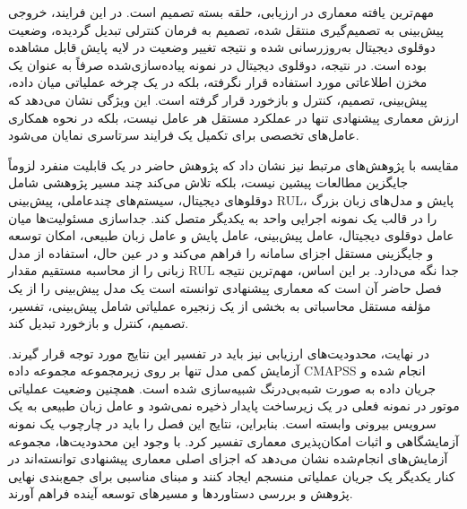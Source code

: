 مهم‌ترین یافته معماری در ارزیابی، حلقه بسته تصمیم است. در این فرایند، خروجی پیش‌بینی به تصمیم‌گیری منتقل شده، تصمیم به فرمان کنترلی تبدیل گردیده، وضعیت دوقلوی دیجیتال به‌روزرسانی شده و نتیجه تغییر وضعیت در لایه پایش قابل مشاهده بوده است. در نتیجه، دوقلوی دیجیتال در نمونه پیاده‌سازی‌شده صرفاً به عنوان یک مخزن اطلاعاتی مورد استفاده قرار نگرفته، بلکه در یک چرخه عملیاتی میان داده، پیش‌بینی، تصمیم، کنترل و بازخورد قرار گرفته است. این ویژگی نشان می‌دهد که ارزش معماری پیشنهادی تنها در عملکرد مستقل هر عامل نیست، بلکه در نحوه همکاری عامل‌های تخصصی برای تکمیل یک فرایند سرتاسری نمایان می‌شود.

مقایسه با پژوهش‌های مرتبط نیز نشان داد که پژوهش حاضر در یک قابلیت منفرد لزوماً جایگزین مطالعات پیشین نیست، بلکه تلاش می‌کند چند مسیر پژوهشی شامل دوقلوهای دیجیتال، سیستم‌های چندعاملی، پیش‌بینی \gls{RUL}، پایش و مدل‌های زبان بزرگ را در قالب یک نمونه اجرایی واحد به یکدیگر متصل کند. جداسازی مسئولیت‌ها میان عامل دوقلوی دیجیتال، عامل پیش‌بینی، عامل پایش و عامل زبان طبیعی، امکان توسعه و جایگزینی مستقل اجزای سامانه را فراهم می‌کند و در عین حال، استفاده از مدل زبانی را از محاسبه مستقیم مقدار \gls{RUL} جدا نگه می‌دارد. بر این اساس، مهم‌ترین نتیجه فصل حاضر آن است که معماری پیشنهادی توانسته است یک مدل پیش‌بینی را از یک مؤلفه مستقل محاسباتی به بخشی از یک زنجیره عملیاتی شامل پیش‌بینی، تفسیر، تصمیم، کنترل و بازخورد تبدیل کند.

در نهایت، محدودیت‌های ارزیابی نیز باید در تفسیر این نتایج مورد توجه قرار گیرند. آزمایش کمی مدل تنها بر روی زیرمجموعه  مجموعه داده \gls{CMAPSS} انجام شده و جریان داده به صورت شبه‌بی‌درنگ شبیه‌سازی شده است. همچنین وضعیت عملیاتی موتور در نمونه فعلی در یک زیرساخت پایدار ذخیره نمی‌شود و عامل زبان طبیعی به یک سرویس بیرونی وابسته است. بنابراین، نتایج این فصل را باید در چارچوب یک نمونه آزمایشگاهی و اثبات امکان‌پذیری معماری تفسیر کرد. با وجود این محدودیت‌ها، مجموعه آزمایش‌های انجام‌شده نشان می‌دهد که اجزای اصلی معماری پیشنهادی توانسته‌اند در کنار یکدیگر یک جریان عملیاتی منسجم ایجاد کنند و مبنای مناسبی برای جمع‌بندی نهایی پژوهش و بررسی دستاوردها و مسیرهای توسعه آینده فراهم آورند.






